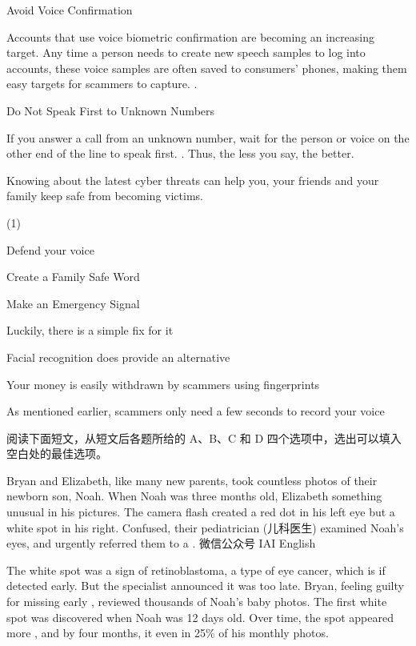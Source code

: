\documentclass{英语试卷}
\begin{document}
\par Avoid Voice Confirmation\par
\par Accounts that use voice biometric confirmation are becoming an increasing target. Any time a person needs to create new speech samples to log into accounts, these voice samples are often saved to consumers' phones, making them easy targets for scammers to capture. .\par
\par Do Not Speak First to Unknown Numbers\par
\par If you answer a call from an unknown number, wait for the person or voice on the other end of the line to speak first. . Thus, the less you say, the better.\par
\par Knowing about the latest cyber threats can help you, your friends and your family keep safe from becoming victims.\par
\begin{choices}(1)
  \item Defend your voice
  \item Create a Family Safe Word
  \item Make an Emergency Signal
  \item Luckily, there is a simple fix for it
  \item Facial recognition does provide an alternative
  \item Your money is easily withdrawn by scammers using fingerprints
  \item As mentioned earlier, scammers only need a few seconds to record your voice
\end{choices}
\par 阅读下面短文，从短文后各题所给的 A、B、C 和 D 四个选项中，选出可以填入空白处的最佳选项。\par
\par Bryan and Elizabeth, like many new parents, took countless photos of their newborn son, Noah. When Noah was three months old, Elizabeth  something unusual in his pictures. The camera flash created a red dot in his left eye but a white spot in his right. Confused, their pediatrician (儿科医生) examined Noah's eyes, and urgently referred them to a . 微信公众号 IAI English\par
\par The white spot was a  sign of retinoblastoma, a type of eye cancer, which is  if detected early. But the specialist announced it was too late. Bryan, feeling guilty for missing early , reviewed thousands of Noah's baby photos. The first white spot was discovered when Noah was 12 days old. Over time, the spot appeared more , and by four months, it even  in 25\% of his monthly photos.\par
\end{document}
